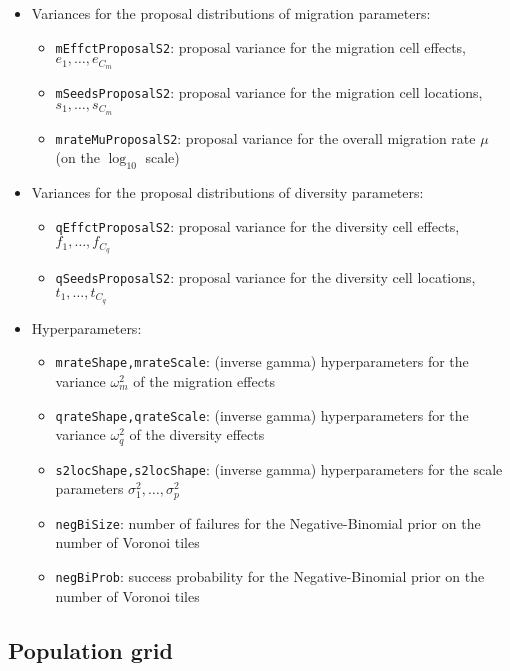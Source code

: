 \documentclass[a4paper,10pt,DIV=15,titlepage,mpinclude=true]{scrartcl}
\newcommand{\keystring}[1]{{\tt #1}}
\begin{document}
\begin{itemize}
\item Variances for the proposal distributions of migration parameters:
\begin{itemize}
  \item \keystring{mEffctProposalS2}: proposal variance for the migration cell effects, $e_1,\ldots,e_{C_m}$
  \item \keystring{mSeedsProposalS2}: proposal variance for the migration cell locations, $s_1,\ldots,s_{C_m}$
  \item \keystring{mrateMuProposalS2}: proposal variance for the overall migration rate $\mu$ (on the $\log_{10}$ scale)
\end{itemize}
\item Variances for the proposal distributions of diversity parameters:
\begin{itemize}
  \item \keystring{qEffctProposalS2}: proposal variance for the diversity cell effects, $f_1,\ldots,f_{C_q}$
  \item \keystring{qSeedsProposalS2}: proposal variance for the diversity cell locations, $t_1,\ldots,t_{C_q}$
\end{itemize}
\item Hyperparameters:
\begin{itemize}
  \item \keystring{mrateShape,mrateScale}: (inverse gamma) hyperparameters for the variance $\omega_m^2$ of the migration effects
  \item \keystring{qrateShape,qrateScale}: (inverse gamma) hyperparameters for the variance $\omega_q^2$ of the diversity effects
  \item \keystring{s2locShape,s2locShape}: (inverse gamma) hyperparameters for the scale parameters $\sigma_1^2,\ldots,\sigma_p^2$
  \item \keystring{negBiSize}: number of failures for the Negative-Binomial prior on the number of Voronoi tiles
  \item \keystring{negBiProb}: success probability for the Negative-Binomial prior on the number of Voronoi tiles
\end{itemize}
\end{itemize}

\subsection{Population grid}\label{sec:pop-grid}
\end{document}
